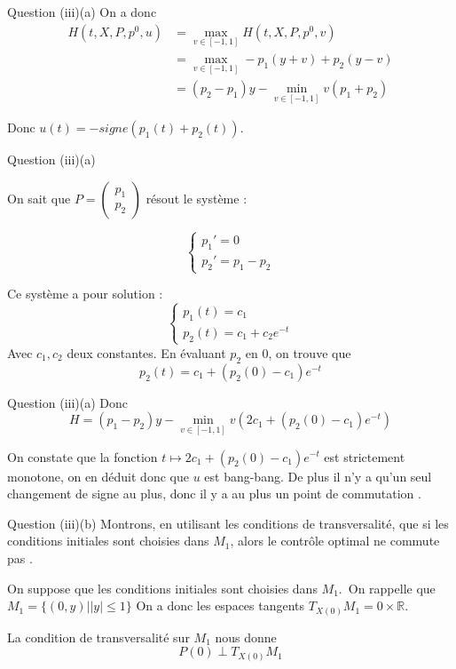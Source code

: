 \documentclass[11pt]{beamer}
\begin{document}
\begin{frame}{Question (iii)(a)}
On a donc 
\begin{align*}
H(t,X,P,p^0,u) &= \max_{v\in[-1,1]} H(t,X,P,p^0,v) \\
&= \max_{v\in[-1,1]} -p_1(y+v) + p_2(y-v) \\
&= (p_2-p_1)y - \min_{v\in[-1,1]} v(p_1+p_2)
\end{align*}

Donc $u(t)=-signe(p_1(t)+p_2(t))$.

\end{frame}

\begin{frame}{Question (iii)(a)}

On sait que $P= \begin{pmatrix} p_1 \\ p_2 \end{pmatrix}$ résout le système :

$$
\left\{
\begin{array}{ll}
p_1' = 0 \\
p_2' = p_1-p_2
\end{array}
\right.
$$

Ce système a pour solution :
$$
\left\{
\begin{array}{ll}
p_1(t) = c_1 \\
p_2(t) = c_1 + c_2e^{-t}
\end{array}
\right.
$$
Avec $c_1,c_2$ deux constantes.\newline
En évaluant $p_2$ en $0$, on trouve que  
\begin{equation}
p_2(t) = c_1 + (p_2(0)-c_1)e^{-t}
\end{equation}
\end{frame}

\begin{frame}{Question (iii)(a)}
Donc 
\begin{equation}
H = (p_1-p_2)y - \min_{v\in[-1,1]} v(2c_1 + (p_2(0)-c_1)e^{-t})
\end{equation}

On constate que la fonction $t\longmapsto 2c_1 + (p_2(0)-c_1)e^{-t}$ est strictement monotone, on en déduit donc que $u$ est bang-bang.
De plus il n'y a qu'un seul changement de signe au plus, donc il y a au plus un point de commutation .
\end{frame}

\begin{frame}{Question (iii)(b)}
Montrons, en utilisant les conditions de transversalité, que si les conditions initiales sont choisies dans $M_1$, alors le contrôle optimal ne commute pas .\newline

On suppose que les conditions initiales sont choisies dans $M_1$.\
On rappelle que  $M_1 = \{(0,y)| |y|\leq 1\}$
On a donc les espaces tangents $T_{X(0)}M_1 = {0}\times\mathbb{R}$.\newline

La condition de transversalité sur $M_1$ nous donne 
\begin{equation*}
P(0) \perp T_{X(0)}M_1
\end{equation*}
\end{frame}
\end{document}
